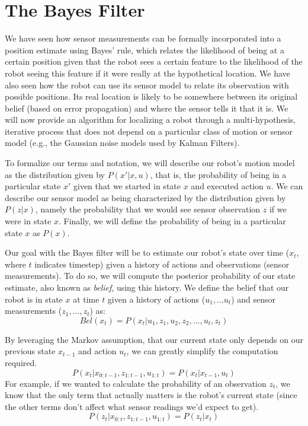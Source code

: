 \section{The Bayes Filter}
We have seen how sensor measurements can be formally incorporated into a position estimate using Bayes' rule, which relates the likelihood of being at a certain position given that the robot sees a certain feature to the likelihood of the robot seeing this feature if it were really at the hypothetical location. We have also seen how the robot can use its sensor model to relate its observation with possible positions. 
Its real location is likely to be somewhere between its original belief (based on error propagation) and where the sensor tells it that it is. We will now provide an algorithm for localizing a robot through a multi-hypothesis, iterative process that does not depend on a particular class of motion or sensor model (e.g., the Gaussian noise models used by Kalman Filters).

To formalize our terms and notation, we will describe our robot's motion model as the distribution given by $P(x'|x,u)$, that is, the probability of being in a particular state $x'$ given that we started in state $x$ and executed action $u$. We can describe our sensor model as being characterized by the distribution given by $P(z|x)$, namely the probability that we would see sensor observation $z$ if we were in state $x$. Finally, we will define the probability of being in a particular state $x$ as $P(x)$. 

Our goal with the Bayes filter will be to estimate our robot's state over time ($x_t$, where $t$ indicates timestep) given a history of actions and observations (sensor measurements). To do so, we will compute the posterior probability of our state estimate, also known as \textsl{belief}, using this history. We define the belief that our robot is in state $x$ at time $t$ given a history of actions ($u_1,...u_t$) and sensor measurements ($z_1,...,z_t$) as:
$$
Bel(x_t) = P(x_t|u_1,z_1,u_2,z_2,...,u_t,z_t)
$$

By leveraging the Markov assumption, that our current state only depends on our previous state $x_{t-1}$ and action $u_t$, we can greatly simplify the computation required. 
$$
P(x_t|x_{0:t-1}, z_{1:t-1}, u_{1:t}) = P(x_t|x_{t-1},u_t)
$$
For example, if we wanted to calculate the probability of an observation $z_t$, we know that the only term that actually matters is the robot's current state (since the other terms don't affect what sensor readings we'd expect to get).
$$
P(z_t|x_{0:t}, z_{1:t-1}, u_{1:t}) = P(z_t|x_t)
$$

